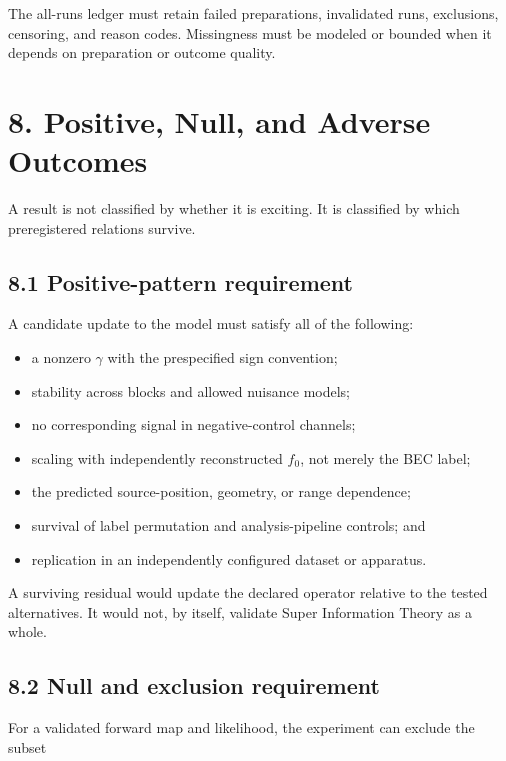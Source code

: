\documentclass[
  american,
  11pt,
  letterpaper,
]{article}
\providecommand{\tightlist}{%
  \setlength{\itemsep}{0pt}\setlength{\parskip}{0pt}}
\begin{document}
The all-runs ledger must retain failed preparations, invalidated runs, exclusions, censoring, and reason codes. Missingness must be modeled or bounded when it depends on preparation or outcome quality.

\section{8. Positive, Null, and Adverse Outcomes}\label{positive-null-and-adverse-outcomes}

A result is not classified by whether it is exciting. It is classified by which preregistered relations survive.

\subsection{8.1 Positive-pattern requirement}\label{positive-pattern-requirement}

A candidate update to the model must satisfy all of the following:

\begin{itemize}
\tightlist
\item
  a nonzero \(\gamma\) with the prespecified sign convention;
\item
  stability across blocks and allowed nuisance models;
\item
  no corresponding signal in negative-control channels;
\item
  scaling with independently reconstructed \(f_0\), not merely the BEC label;
\item
  the predicted source-position, geometry, or range dependence;
\item
  survival of label permutation and analysis-pipeline controls; and
\item
  replication in an independently configured dataset or apparatus.
\end{itemize}

A surviving residual would update the declared operator relative to the tested alternatives. It would not, by itself, validate Super Information Theory as a whole.

\subsection{8.2 Null and exclusion requirement}\label{null-and-exclusion-requirement}

For a validated forward map and likelihood, the experiment can exclude the subset
\end{document}
